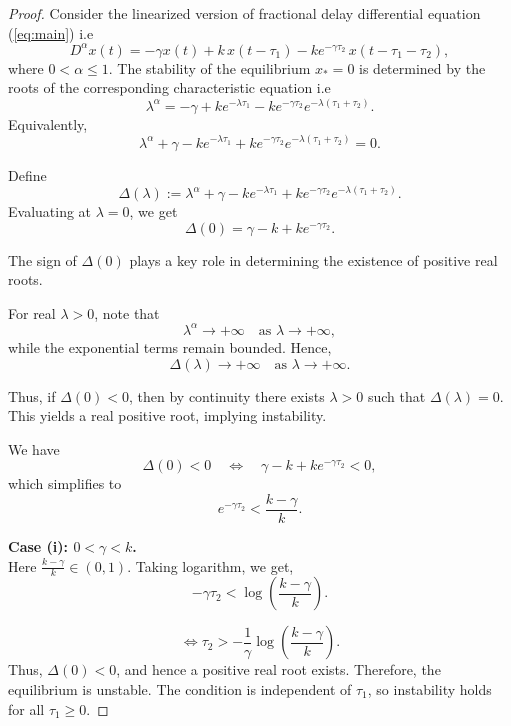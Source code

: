 \documentclass[10pt,a4paper]{amsart}
\begin{document}
\begin{proof}
	Consider the linearized version of  fractional delay differential equation (\ref{eq:main}) i.e 
	\begin{equation}
		D^{\alpha} x(t)
		= -\gamma x(t)
		+ k\,x(t - \tau_1)
		- k e^{-\gamma \tau_2}\, x(t - \tau_1 - \tau_2),
	\end{equation}
	where $0<\alpha\le 1$. The stability of the equilibrium $x_*=0$ is determined by the roots of the corresponding characteristic equation i.e
	\[
	\lambda^{\alpha}
	= -\gamma + k e^{-\lambda \tau_1}
	- k e^{-\gamma \tau_2} e^{-\lambda(\tau_1+\tau_2)}.
	\]
	Equivalently,
	\begin{equation}
		\lambda^{\alpha} + \gamma
		- k e^{-\lambda \tau_1}
		+ k e^{-\gamma \tau_2} e^{-\lambda(\tau_1+\tau_2)}=0.
		\label{char}
	\end{equation}
	
	\medskip

	Define
	\[
	\Delta(\lambda)
	:= \lambda^{\alpha} + \gamma
	- k e^{-\lambda \tau_1}
	+ k e^{-\gamma \tau_2} e^{-\lambda(\tau_1+\tau_2)}.
	\]
	Evaluating at $\lambda=0$, we get
	\[
	\Delta(0)
	= \gamma - k + k e^{-\gamma \tau_2}.
	\]
	
	The sign of $\Delta(0)$ plays a key role in determining the existence of positive real roots.
	
	\medskip

	
	For real $\lambda>0$, note that
	\[
	\lambda^{\alpha} \to +\infty \quad \text{as } \lambda \to +\infty,
	\]
	while the exponential terms remain bounded. Hence,
	\[
	\Delta(\lambda)\to +\infty \quad \text{as } \lambda\to+\infty.
	\]
	
	Thus, if $\Delta(0)<0$, then by continuity there exists $\lambda>0$ such that $\Delta(\lambda)=0$. This yields a real positive root, implying instability.
	
	\medskip
	\noindent

	
	We have
	\[
	\Delta(0)<0
	\quad \Longleftrightarrow \quad
	\gamma - k + k e^{-\gamma \tau_2} < 0,
	\]
	which simplifies to
	\[
	e^{-\gamma \tau_2} < \frac{k-\gamma}{k}.
	\]
	
	\medskip
	\noindent
	\textbf{Case (i): $0<\gamma<k$.}\\

	Here $\frac{k-\gamma}{k}\in(0,1)$. Taking logarithm, we get,
	\[
	-\gamma \tau_2 < \log\left(\frac{k-\gamma}{k}\right).
	\]
	
	\[
\Leftrightarrow	\tau_2 > -\frac{1}{\gamma}\log\left(\frac{k-\gamma}{k}\right).
	\]
	Thus, $\Delta(0)<0$, and hence a positive real root exists. Therefore, the equilibrium is unstable. The condition is independent of $\tau_1$, so instability holds for all $\tau_1\ge 0$.
	

\end{proof}
\end{document}
